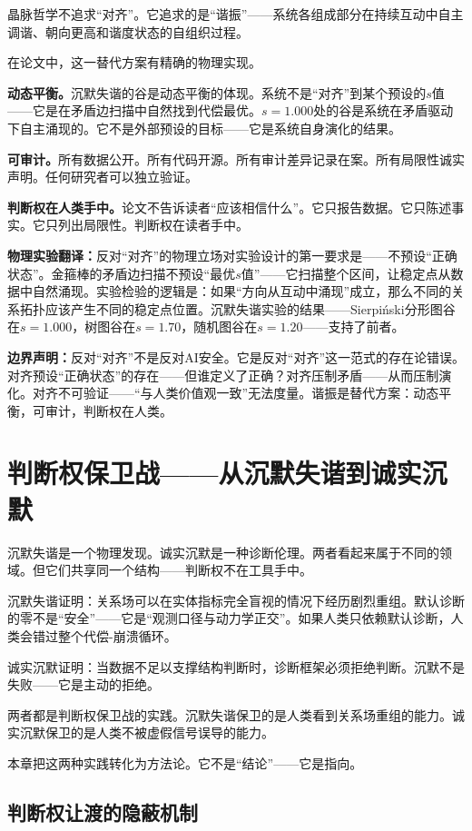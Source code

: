 \documentclass[11pt,a4paper]{book}
\theoremstyle{definition}
\begin{document}
晶脉哲学不追求“对齐”。它追求的是“谐振”——系统各组成部分在持续互动中自主调谐、朝向更高和谐度状态的自组织过程。

在论文中，这一替代方案有精确的物理实现。

\textbf{动态平衡。}沉默失谐的谷是动态平衡的体现。系统不是“对齐”到某个预设的$s$值——它是在矛盾边扫描中自然找到代偿最优。$s=1.000$处的谷是系统在矛盾驱动下自主涌现的。它不是外部预设的目标——它是系统自身演化的结果。

\textbf{可审计。}所有数据公开。所有代码开源。所有审计差异记录在案。所有局限性诚实声明。任何研究者可以独立验证。

\textbf{判断权在人类手中。}论文不告诉读者“应该相信什么”。它只报告数据。它只陈述事实。它只列出局限性。判断权在读者手中。

\textbf{物理实验翻译：}反对“对齐”的物理立场对实验设计的第一要求是——不预设“正确状态”。金箍棒的矛盾边扫描不预设“最优$s$值”——它扫描整个区间，让稳定点从数据中自然涌现。实验检验的逻辑是：如果“方向从互动中涌现”成立，那么不同的关系拓扑应该产生不同的稳定点位置。沉默失谐实验的结果——Sierpiński分形图谷在$s=1.000$，树图谷在$s=1.70$，随机图谷在$s=1.20$——支持了前者。

\textbf{边界声明：}反对“对齐”不是反对AI安全。它是反对“对齐”这一范式的存在论错误。对齐预设“正确状态”的存在——但谁定义了正确？对齐压制矛盾——从而压制演化。对齐不可验证——“与人类价值观一致”无法度量。谐振是替代方案：动态平衡，可审计，判断权在人类。

\chapter{判断权保卫战——从沉默失谐到诚实沉默}

沉默失谐是一个物理发现。诚实沉默是一种诊断伦理。两者看起来属于不同的领域。但它们共享同一个结构——判断权不在工具手中。

沉默失谐证明：关系场可以在实体指标完全盲视的情况下经历剧烈重组。默认诊断的零不是“安全”——它是“观测口径与动力学正交”。如果人类只依赖默认诊断，人类会错过整个代偿-崩溃循环。

诚实沉默证明：当数据不足以支撑结构判断时，诊断框架必须拒绝判断。沉默不是失败——它是主动的拒绝。

两者都是判断权保卫战的实践。沉默失谐保卫的是人类看到关系场重组的能力。诚实沉默保卫的是人类不被虚假信号误导的能力。

本章把这两种实践转化为方法论。它不是“结论”——它是指向。

\section{判断权让渡的隐蔽机制}
\end{document}
